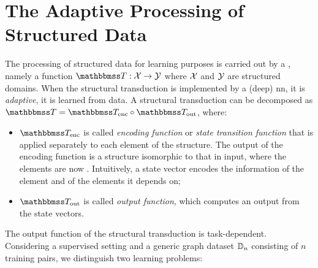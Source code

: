 \section{The Adaptive Processing of Structured Data}
The processing of structured data for learning purposes is carried out by a , namely a function $\Transduction: \Cal{x} \shortrightarrow \Cal{y}$ where $\Cal{X}$ and $\Cal{Y}$ are structured domains. When the structural transduction is implemented by a (deep) \gls{nn}, it is \emph{adaptive}, \ie it is learned from data. A structural transduction can be decomposed as $\Transduction = \Transduction_{\Fun{enc}} \circ \Transduction_{\Fun{out}}$, where:
\begin{itemize}
    \item $\Transduction_{\Fun{enc}}$ is called \emph{encoding function} or \emph{state transition function} that is applied separately to each element of the structure. The output of the encoding function is a structure isomorphic to that in input, where the elements are now . Intuitively, a state vector encodes the information of the element and of the elements it depends on;
    \item $\Transduction_{\Fun{out}}$ is called \emph{output function}, which computes an output from the state vectors.
\end{itemize}
The output function of the structural transduction is task-dependent. Considering a supervised setting and a generic graph dataset $\mathbb{D}_n$ consisting of $n$ training pairs, we distinguish two learning problems:
